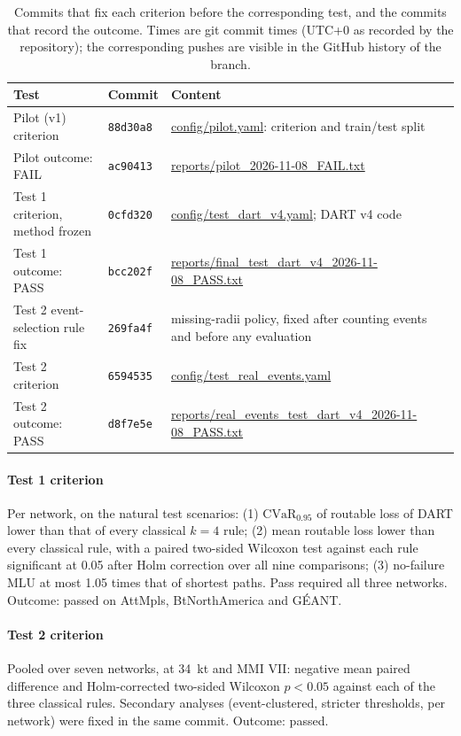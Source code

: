 \documentclass[12pt]{article}
\begin{document}
\begin{table}[h]
\centering
\caption{Commits that fix each criterion before the corresponding test, and the commits that record the outcome. Times are git commit times (UTC+0 as recorded by the repository); the corresponding pushes are visible in the GitHub history of the branch.}
\label{tab:s2}
\small
\begin{tabular}{p{4.6cm}p{2.0cm}p{7.5cm}}
\toprule
Test & Commit & Content \\
\midrule
Pilot (v1) criterion & \texttt{88d30a8} & \url{config/pilot.yaml}: criterion and train/test split \\
Pilot outcome: FAIL & \texttt{ac90413} & \url{reports/pilot_2026-11-08_FAIL.txt} \\
Test 1 criterion, method frozen & \texttt{0cfd320} & \url{config/test_dart_v4.yaml}; DART v4 code \\
Test 1 outcome: PASS & \texttt{bcc202f} & \url{reports/final_test_dart_v4_2026-11-08_PASS.txt} \\
Test 2 event-selection rule fix & \texttt{269fa4f} & missing-radii policy, fixed after counting events and before any evaluation \\
Test 2 criterion & \texttt{6594535} & \url{config/test_real_events.yaml} \\
Test 2 outcome: PASS & \texttt{d8f7e5e} & \url{reports/real_events_test_dart_v4_2026-11-08_PASS.txt} \\
\bottomrule
\end{tabular}
\end{table}

\paragraph{Test 1 criterion} Per network, on the natural test scenarios: (1) $\mathrm{CVaR}_{0.95}$ of routable loss of DART lower than that of every classical $k=4$ rule; (2) mean routable loss lower than every classical rule, with a paired two-sided Wilcoxon test against each rule significant at 0.05 after Holm correction over all nine comparisons; (3) no-failure MLU at most 1.05 times that of shortest paths. Pass required all three networks. Outcome: passed on AttMpls, BtNorthAmerica and G\'EANT.

\paragraph{Test 2 criterion} Pooled over seven networks, at 34~kt and MMI VII: negative mean paired difference and Holm-corrected two-sided Wilcoxon $p<0.05$ against each of the three classical rules. Secondary analyses (event-clustered, stricter thresholds, per network) were fixed in the same commit. Outcome: passed.
\end{document}
